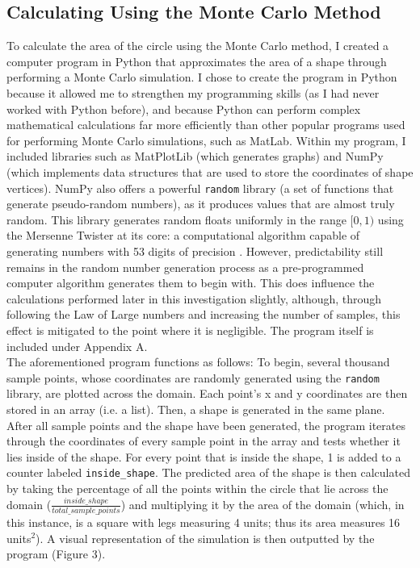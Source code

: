 \documentclass[11pt]{article}
\begin{document}
\subsection{Calculating Using the Monte Carlo Method}
To calculate the area of the circle using the Monte Carlo method, I created a computer program in Python that approximates the area of a shape through performing a Monte Carlo simulation. I chose to create the program in Python because it allowed me to strengthen my programming skills (as I had never worked with Python before), and because Python can perform complex mathematical calculations far more efficiently than other popular programs used for performing Monte Carlo simulations, such as MatLab. Within my program, I included libraries such as MatPlotLib (which generates graphs) and NumPy (which implements data structures that are used to store the coordinates of shape vertices). NumPy also offers a powerful \texttt{random} library (a set of functions that generate pseudo-random numbers), as it produces values that are almost truly random. This library generates random floats uniformly in the range $[0, 1)$ using the Mersenne Twister at its core: a computational algorithm capable of generating numbers with 53 digits of precision \cite{pythongen}. However, predictability still remains in the random number generation process as a pre-programmed computer algorithm generates them to begin with. This does influence the calculations performed later in this investigation slightly, although, through following the Law of Large numbers and increasing the number of samples, this effect is mitigated to the point where it is negligible. The program itself is included under Appendix A.\\[-2ex]

The aforementioned program functions as follows: To begin, several thousand sample points, whose coordinates are randomly generated using the \texttt{random} library, are plotted across the domain. Each point's x and y coordinates are then stored in an array (i.e. a list). Then, a shape is generated in the same plane. After all sample points and the shape have been generated, the program iterates through the coordinates of every sample point in the array and tests whether it lies inside of the shape. For every point that is inside the shape, 1 is added to a counter labeled \texttt{inside\_shape}. The predicted area of the shape is then calculated by taking the percentage of all the points within the circle that lie across the domain ($ \frac{inside\_shape}{total\_sample\_points}$) and multiplying it by the area of the domain (which, in this instance, is a square with legs measuring 4 units; thus its area measures 16 units$^2$). A visual representation of the simulation is then outputted by the program (Figure 3).\\[-5ex]
\end{document}
